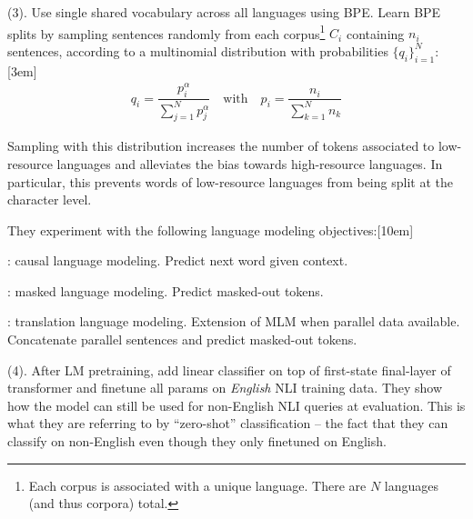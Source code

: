 \documentclass[11pt]{article}
\begin{document}









 (3). Use single shared vocabulary across all languages using BPE. Learn BPE splits by sampling sentences randomly from each corpus\footnote{Each corpus is associated with a unique language. There are $N$ languages (and thus corpora) total.} $C_i$ containing $n_i$ sentences, according to a multinomial distribution with probabilities $\{q_i\}_{i=1}^{N}$:[3em]
\begin{align}
	q_i = \dfrac{p_i^{\alpha}}{\sum_{j=1}^N p_j^{\alpha}} 
	\quad \text{with} \quad 
	p_i = \dfrac{n_i}{\sum_{k=1}^{N} n_k}
\end{align}
\begin{myquote}[-1.5em]
	Sampling with this distribution increases the number of tokens associated to low-resource languages and alleviates the bias towards high-resource languages. In particular, this prevents words of low-resource languages from being split at the character level.
\end{myquote}

They experiment with the following language modeling objectives:[10em]
\begin{compactitem}
	\item {}: causal language modeling. Predict next word given context.
	
	\item {}: masked language modeling. Predict masked-out tokens. 
	
	\item {}: translation language modeling. Extension of MLM when parallel data available. Concatenate parallel sentences and predict masked-out tokens.
\end{compactitem}

 (4). After LM pretraining, add linear classifier on top of first-state final-layer of transformer and finetune all params on \textit{English} NLI training data. They show how the model can still be used for non-English NLI queries at evaluation. This is what they are referring to by ``zero-shot'' classification -- the fact that they can classify on non-English even though they only finetuned on English.
\end{document}
